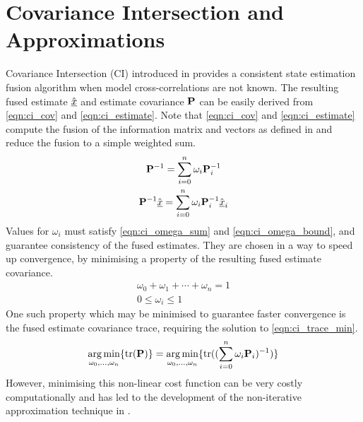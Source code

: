 \documentclass[letterpaper, 10 pt, conference]{ieeeconf}  %
\begin{document}
\section{Covariance Intersection and Approximations} \label{sec:ci}
Covariance Intersection (CI) introduced in \cite{julierNondivergentEstimationAlgorithm} provides a consistent state estimation fusion algorithm when model cross-correlations are not known. The resulting fused estimate $\hat{{\underline{x}}}$ and estimate covariance ${{\mathbf{P}}}$ can be easily derived from \eqref{eqn:ci_cov} and \eqref{eqn:ci_estimate}. Note that \eqref{eqn:ci_cov} and \eqref{eqn:ci_estimate} compute the fusion of the information matrix and vectors as defined in \cite{niehsenInformationFusionBased2002} and reduce the fusion to a simple weighted sum.
\begin{gather}
   {\ensuremath{{\mathbf{P}}}}^{-1}=\sum_{i=0}^{n}\omega_i {{\mathbf{P}}}_i^{-1} \label{eqn:ci_cov}\\
   {{\mathbf{P}}}^{-1} \hat{{\underline{x}}} =\sum_{i=0}^{n}\omega_i {{\mathbf{P}}}_i^{-1} \hat{{\underline{x}}}_i \label{eqn:ci_estimate}
\end{gather}
Values for $\omega_i$ must satisfy \eqref{eqn:ci_omega_sum} and \eqref{eqn:ci_omega_bound}, and guarantee consistency of the fused estimates. They are chosen in a way to speed up convergence, by minimising a property of the resulting fused estimate covariance.
\begin{gather}
   \omega_0 + \omega_1 + \cdots + \omega_n = 1 \label{eqn:ci_omega_sum}\\
   0 \leq \omega_i \leq 1 \label{eqn:ci_omega_bound}
\end{gather}
One such property which may be minimised to guarantee faster convergence is the fused estimate covariance trace, requiring the solution to \eqref{eqn:ci_trace_min}.
\begin{gather}
   \operatorname*{arg\,min}_{\omega_0,\dots,\omega_n} \{\operatorname{tr}({{\mathbf{P}}})\} = \operatorname*{arg\,min}_{\omega_0,\dots,\omega_n} \{\operatorname{tr}((\sum_{i=0}^{n}\omega_i {{\mathbf{P}}}_i)^{-1})\} \label{eqn:ci_trace_min}
\end{gather}
However, minimising this non-linear cost function can be very costly computationally and has led to the development of the non-iterative approximation technique in \cite{niehsenInformationFusionBased2002}.
\end{document}
